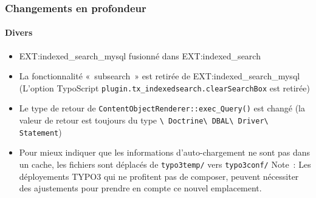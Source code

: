 
\begin{frame}[fragile]
	\frametitle{Changements en profondeur}
	\framesubtitle{Divers}

	\begin{itemize}

		\item EXT:indexed\_search\_mysql fusionné dans EXT:indexed\_search

		\item La fonctionnalité «~subsearch~» est retirée de EXT:indexed\_search\_mysql\newline
			\smaller
				(L'option TypoScript \texttt{plugin.tx\_indexedsearch.clearSearchBox} est retirée)
			\normalsize

		\item Le type de retour de \texttt{ContentObjectRenderer::exec\_Query()} est changé\newline
			\smaller
				(la valeur de retour est toujours du type
					\texttt{\textbackslash
						Doctrine\textbackslash
						DBAL\textbackslash
						Driver\textbackslash
						Statement})
			\normalsize

		\item Pour mieux indiquer que les informations d'auto-chargement ne sont pas
			dans un cache, les fichiers sont déplacés de \texttt{typo3temp/} vers
			\texttt{typo3conf/}\newline
			\smaller
				Note~: Les déployements TYPO3 qui ne profitent pas de composer, peuvent nécessiter
				des ajustements pour prendre en compte ce nouvel emplacement.
			\normalsize

	\end{itemize}

\end{frame}

